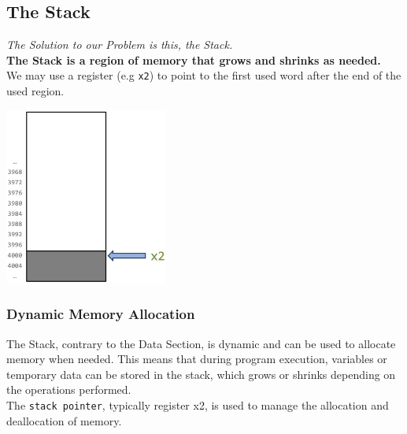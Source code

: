 \subsection{The Stack}
\textit{The Solution to our Problem is this, the Stack.} \\
\textbf{The Stack is a region of memory that grows and shrinks as needed.} \\
We may use a register (e.g \texttt{x2}) to point to the first used word after the end of the used region.
\begin{center}
    \includegraphics[width=0.4\textwidth]{chapters/chapter1b/images/stack.png}
\end{center}

\subsubsection{Dynamic Memory Allocation}
The Stack, contrary to the Data Section, is dynamic and can be used to allocate memory when needed. This means that during program execution, variables or temporary data can be stored in the stack, which grows or shrinks depending on the operations performed. \\
 The \texttt{stack pointer}, typically register x2, is used to manage the allocation and deallocation of memory.

